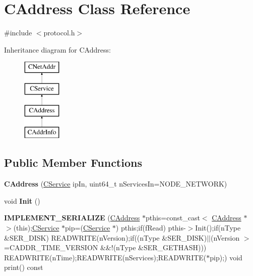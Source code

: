 \hypertarget{class_c_address}{}\section{C\+Address Class Reference}
\label{class_c_address}


{\ttfamily \#include $<$protocol.\+h$>$}

Inheritance diagram for C\+Address\+:\begin{figure}[H]
\begin{center}
\leavevmode
\includegraphics[height=4.000000cm]{class_c_address}
\end{center}
\end{figure}
\subsection*{Public Member Functions}
\begin{DoxyCompactItemize}
\item 
\mbox{\label{class_c_address_a806e75f363ec49bfab92a686a8774ac3}} 
{\bfseries C\+Address} (\mbox{\hyperlink{class_c_service}{C\+Service}} ip\+In, uint64\+\_\+t n\+Services\+In=N\+O\+D\+E\+\_\+\+N\+E\+T\+W\+O\+RK)
\item 
\mbox{\label{class_c_address_ac060c84dcf47b8ccfae0142c9b29a243}} 
void {\bfseries Init} ()
\item 
\mbox{\label{class_c_address_a52b774fdae8136098146391c6cdca2c4}} 
{\bfseries I\+M\+P\+L\+E\+M\+E\+N\+T\+\_\+\+S\+E\+R\+I\+A\+L\+I\+ZE} (\mbox{\hyperlink{class_c_address}{C\+Address}} $\ast$pthis=const\+\_\+cast$<$ \mbox{\hyperlink{class_c_address}{C\+Address}} $\ast$ $>$(this);\mbox{\hyperlink{class_c_service}{C\+Service}} $\ast$pip=(\mbox{\hyperlink{class_c_service}{C\+Service}} $\ast$) pthis;if(f\+Read) pthis-\/$>$Init();if(n\+Type \&S\+E\+R\+\_\+\+D\+I\+SK) R\+E\+A\+D\+W\+R\+I\+TE(n\+Version);if((n\+Type \&S\+E\+R\+\_\+\+D\+I\+SK)$\vert$$\vert$(n\+Version $>$=C\+A\+D\+D\+R\+\_\+\+T\+I\+M\+E\+\_\+\+V\+E\+R\+S\+I\+ON \&\&!(n\+Type \&S\+E\+R\+\_\+\+G\+E\+T\+H\+A\+SH))) R\+E\+A\+D\+W\+R\+I\+TE(n\+Time);R\+E\+A\+D\+W\+R\+I\+TE(n\+Services);R\+E\+A\+D\+W\+R\+I\+TE($\ast$pip);) void print() const
\end{DoxyCompactItemize}

